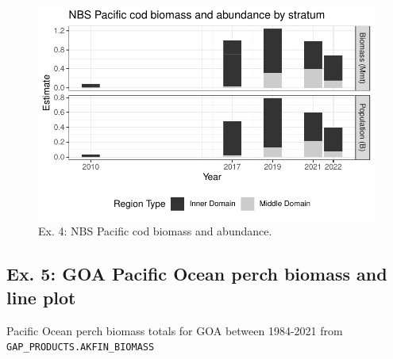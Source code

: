 \documentclass[
  letterpaper,
  oneside,
  open=any]{scrbook}
\begin{document}
\begin{figure}[H]

{\centering \includegraphics{content/akfin-oracle-sql-r_files/figure-pdf/test-4-fig-1.pdf}

}

\caption{Ex. 4: NBS Pacific cod biomass and abundance.}

\end{figure}

\hypertarget{ex.-5-goa-pacific-ocean-perch-biomass-and-line-plot}{%
\subsection{Ex. 5: GOA Pacific Ocean perch biomass and line
plot}\label{ex.-5-goa-pacific-ocean-perch-biomass-and-line-plot}}

Pacific Ocean perch biomass totals for GOA between 1984-2021 from
\texttt{GAP\_PRODUCTS.AKFIN\_BIOMASS}
\end{document}
